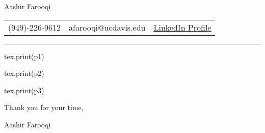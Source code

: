 \documentclass[12pt]{article}
\begin{document}
\begin{center}
	\begingroup
		\fontsize{30}{40}\selectfont Aashir Farooqi
	\endgroup

	\vspace{10pt}

	\begin{tabular}{ c c c } 
		(949)-226-9612 & 
		afarooqi@ucdavis.edu & 
		\href{https://www.linkedin.com/in/aashir-farooqi-4b067b139/}{\underline{LinkedIn Profile}}
	\end{tabular}

	\vspace{15pt}

	\hrule

	\vspace{8pt}

\end{center}


\begin{luacode*}
	tex.print(p1)
\end{luacode*}

\vspace{15pt}

\begin{luacode*}
	tex.print(p2)
\end{luacode*}

\vspace{15pt}

\begin{luacode*}
	tex.print(p3)
\end{luacode*}

\vspace{15pt}




Thank you for your time,

\vspace{15pt}

Aashir Farooqi

\end{document}
